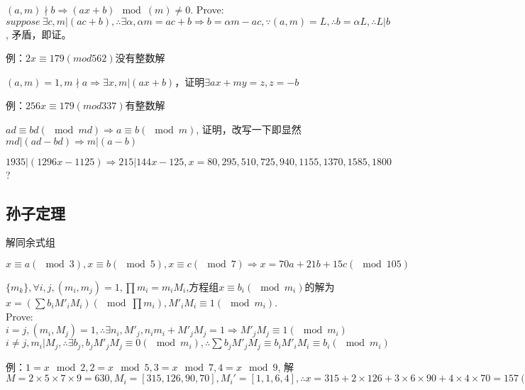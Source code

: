 \documentclass[UTF8]{../09-Mathematics}
\begin{document}
\begin{proposition}
    $(a,m) \nmid b \Rightarrow (ax+b) \mod (m) \neq 0$. Prove:$suppose \ \exists c, m | (ac+b), \therefore \exists \alpha, \alpha m = ac+b \Rightarrow b=\alpha m -ac, \because (a,m) = L, \therefore b = \alpha L, \therefore L | b$, 矛盾，即证。

    例：$2x \equiv 179(mod 562)$没有整数解
\end{proposition}

\begin{proposition}
    $(a,m) =1, m \nmid a \Rightarrow \exists x, m | (ax+b)$，证明$\exists ax+my = z, z = -b$

    例：$256x \equiv 179 (mod 337)$有整数解
\end{proposition}


\begin{proposition}
    $ad \equiv bd (\mod md) \Rightarrow a \equiv b (\mod m)$, 证明，改写一下即显然$md |(ad-bd) \Rightarrow m|(a-b)$
\end{proposition}


\begin{proposition}
    $1935|(1296x-1125) \Rightarrow 215|144x-125, x = 80,295,510,725,940,1155,1370,1585,1800$?
\end{proposition}

\subsection{孙子定理}
解同余式组
\begin{proposition}
    $x \equiv a(\mod 3), x \equiv b(\mod 5),x \equiv c(\mod 7) \Rightarrow x = 70a + 21b + 15c (\mod 105)$
\end{proposition}


\begin{proposition}
    $\{ m_k\}, \forall i,j, (m_i, m_j) = 1, \prod m_i = m_i M_i$,方程组$x \equiv b_i (\mod m_i)$的解为$x = (\sum b_i M'_i M_i)(\mod \prod m_i),  M'_i M_i \equiv 1(\mod m_i)$.\\
    Prove: $i = j, (m_i, M_j) = 1, \therefore \exists n_i, M'_j,  n_i m_i  + M'_j M_j = 1 \Rightarrow M'_j M_j \equiv 1(\mod m_i)$\\
    $i \neq j, m_i|M_j, \therefore \exists b_j, b_j M'_j M_j \equiv 0 (\mod m_i), \therefore \sum b_j M'_j M_j \equiv b_i M'_i M_i \equiv b_i (\mod m_i) $

    例：$1= x \mod 2, 2= x \mod 5, 3= x \mod 7, 4= x \mod 9$, 
    解$M = 2 \times 5 \times 7 \times 9 = 630, M_i =[315,126,90,70], M_i' =[1,1,6,4], \therefore x = 315 + 2\times 126 + 3 \times 6\times 90 + 4\times 4\times 70 = 157(\mod 630), \therefore x = 157 + 630k, k\in \mathbb Z$
\end{proposition}
\end{document}

